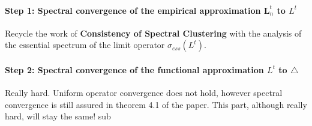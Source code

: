 \paragraph{Step 1: Spectral convergence of the empirical approximation $\mathbf{ L}_n^t$ to $L^t$}
Recycle the work of \textbf{Consistency of Spectral Clustering} with the analysis of the essential spectrum of the limit operator $\sigma_{ess}(L^t)$.
\paragraph{Step 2: Spectral convergence of the functional approximation $L^t$ to $\triangle$}
Really hard. Uniform operator convergence does not hold, however spectral convergence is still assured in theorem 4.1 of the paper. This part, although really hard, will stay the same!
sub